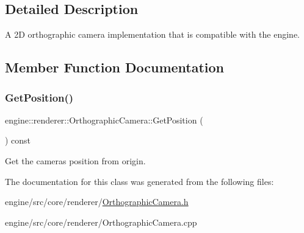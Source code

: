 \subsection{Detailed Description}
A 2D orthographic camera implementation that is compatible with the engine. 

\subsection{Member Function Documentation}
\mbox{\label{classengine_1_1renderer_1_1OrthographicCamera_a89c74cc6487f626475fa5735c153fb16}} 
\subsubsection{\texorpdfstring{Get\+Position()}{GetPosition()}}
{\footnotesize\ttfamily engine\+::renderer\+::\+Orthographic\+Camera\+::\+Get\+Position (\begin{DoxyParamCaption}{ }\end{DoxyParamCaption}) const\hspace{0.3cm}{\ttfamily [inline]}}

Get the cameras position from origin. 

The documentation for this class was generated from the following files\+:\begin{DoxyCompactItemize}
\item 
engine/src/core/renderer/\hyperlink{OrthographicCamera_8h}{Orthographic\+Camera.\+h}\item 
engine/src/core/renderer/Orthographic\+Camera.\+cpp\end{DoxyCompactItemize}
